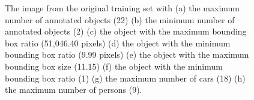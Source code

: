 \documentclass{article}
\begin{document}
\begin{figure}[h!]
    \vspace{-0.1cm}
    \vspace{-0.49cm}
    \caption{The image from the original training set with (a) the maximum number of annotated objects (22) (b) the minimum number of annotated objects (2) (c) the object with the maximum bounding box ratio (51,046.40 pixels) (d) the object with the minimum bounding box ratio (9.99 pixels) (e) the object with the maximum bounding box size (11.15) (f) the object with the minimum bounding box ratio (1) (g) the maximum number of cars (18) (h) the maximum number of persons (9).}
    \label{fig:extreme_train}
\end{figure}
\newpage
\end{document}
